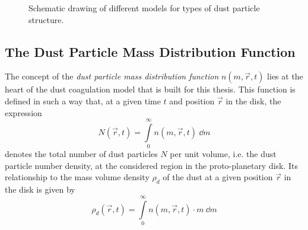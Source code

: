 \begin{figure}[h!]
\begin{minipage}{.5\linewidth}
{
              	}
                \vspace{1cm}
            \end{minipage}
            \caption{
                Schematic drawing of different models for types of dust particle structure. %
            }
            \label{fig:shapes_of_dust_particles}
        \end{figure}

\clearpage\subsection{The Dust Particle Mass Distribution Function}
\label{sec:dust_particle_mass_distribution}

    The concept of the \textit{dust particle mass distribution function} $n(m, \vec r, t)$ 
    lies at the heart of the dust coagulation model that is built for this thesis. 
    This function is defined in such a way that, at a given time $t$ and position $\vec r$ 
    in the disk, the expression
    \begin{equation}
        N(\vec r, t) =\int\limits_0^\infty n(m,\vec r, t)\ \dd m
    \end{equation}
    denotes the total number of dust particles $N$ per unit volume, i.e. the dust particle
    number density, at the considered region in the proto-planetary disk. 
    Its relationship to the mass volume density $\rho_d$ of the dust at a given position 
    $\vec r$ in the disk is given by
    \begin{equation}
        \label{eq:relationship_between_dust_particle_mass_distribution_and_mass_volume_density}
        \rho_d(\vec r, t) =\int\limits_0^\infty n(m,\vec r, t)\cdot m\ \dd m
    \end{equation}

